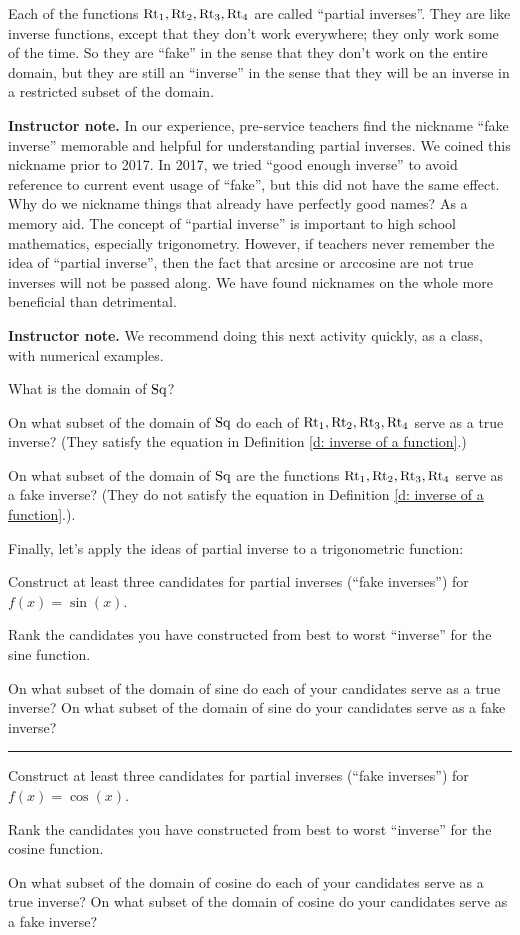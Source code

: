 \documentclass[11pt]{article}
\newcommand\smallnote[1]
	{\begin{mdframed}\raggedright  {\bf Instructor note.} {#1} \end{mdframed}}
\newenvironment{task}
	{\begin{mdframed}[linecolor=lightgray, linewidth=3pt]\raggedright}
	{\end{mdframed}}
\newcommand\tn{\textnormal}
\theoremstyle{definition}
\begin{document}
Each of the functions $\tn{Rt}_1, \tn{Rt}_2, \tn{Rt}_3, \tn{Rt}_4$ are called ``partial inverses''. They are like inverse functions, except that they don't work everywhere; they only work some of the time. So they are ``fake'' in the sense that they don't work on the entire domain, but they are still an ``inverse'' in the sense that they will be an inverse in a restricted subset of the domain.

\smallnote{In our experience, pre-service teachers find the nickname ``fake inverse'' memorable and helpful for understanding partial inverses. We coined this nickname prior to 2017. In 2017, we tried  ``good enough inverse'' to avoid reference to current event usage of ``fake'', but this did not have the same effect.  Why do we nickname things that already have perfectly good names? As a memory aid. The concept of ``partial inverse'' is important to high school mathematics, especially trigonometry. However, if teachers never remember the idea of ``partial inverse'', then the fact that arcsine or arccosine are not true inverses will not be passed along. We have found nicknames on the whole more beneficial than detrimental.}

\smallnote{We recommend doing this next activity quickly, as a class, with numerical examples.}
\begin{task}
What is the domain of $\tn{Sq}$? 

On what subset of the domain of $\tn{Sq}$ do each of  $\tn{Rt}_1, \tn{Rt}_2, \tn{Rt}_3, \tn{Rt}_4$ serve as a true inverse?  (They satisfy the equation in Definition \ref{d: inverse of a function}.)

On what subset of the domain of $\tn{Sq}$ are the functions $\tn{Rt}_1, \tn{Rt}_2, \tn{Rt}_3, \tn{Rt}_4$ serve as a fake inverse? (They do not satisfy the equation in Definition \ref{d: inverse of a function}.). 
\end{task}

Finally, let's apply the ideas of partial inverse to a trigonometric function:
 
\begin{task}
Construct at least three candidates for partial inverses (``fake inverses'') for $f(x)=\sin(x)$. 

Rank the candidates you have constructed from best to worst ``inverse'' for the sine function.

On what subset of the domain of sine do each of your candidates serve as a true inverse? On what subset of the domain of sine do your candidates serve as a fake inverse? 

\vspace*{2pt} \hrule \vspace*{2pt}
Construct at least three candidates for partial inverses (``fake inverses'') for $f(x)=\cos(x)$. 

Rank the candidates you have constructed from best to worst ``inverse'' for the cosine function.

On what subset of the domain of cosine do each of your candidates serve as a true inverse? On what subset of the domain of cosine do your candidates serve as a fake inverse? 
\end{task}
\end{document}
